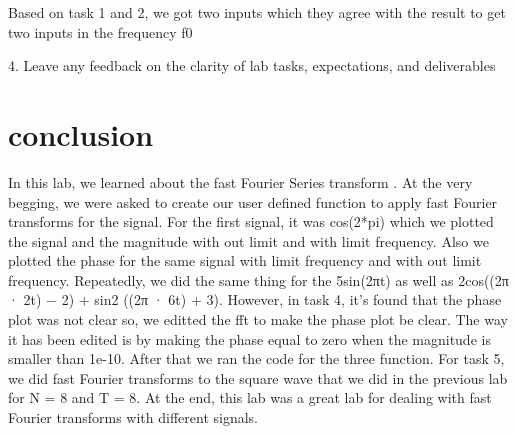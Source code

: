 \documentclass[12pt]{report}
\begin{document}
Based on task 1 and 2, we got two inputs which they agree with the result to get two inputs in the frequency f0

4. Leave any feedback on the clarity of lab tasks, expectations, and deliverables






\section{conclusion}
In this lab, we learned about the fast Fourier Series transform . At the very begging, we were asked to  create our user defined function to apply fast Fourier transforms for the signal. For the first signal, it was cos(2*pi) which we plotted the signal and the magnitude with out limit and with limit frequency. Also we plotted the phase for the same signal with limit frequency and with out limit frequency. Repeatedly, we did the same thing for the 5sin(2πt) as well as 2cos((2π · 2t) − 2) + sin2
((2π · 6t) + 3). However, in task 4, it's found that the phase plot was not clear so, we editted the fft to make the phase plot be clear. The way it has been edited is by making the phase equal to zero when the magnitude is smaller than 1e-10. After that we ran the code for the three function.
For task 5, we did fast Fourier transforms to the square wave that we did in the previous lab for N = 8 and T = 8. At the end, this lab was a great lab for dealing with fast Fourier transforms with different signals.


\newpage
\end{document}
